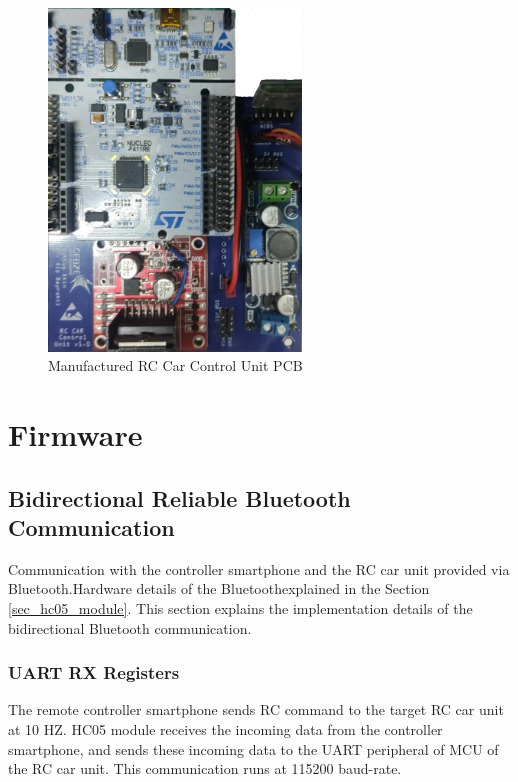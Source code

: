\begin{figure}[!htbp]
    \centering
    \includegraphics[width=0.6\textwidth]{Imgs/pcb_manufactured.jpeg}
    \caption{\label{fig:custom_pcb_manufactured}Manufactured RC Car Control Unit PCB}
\end{figure}


\section{Firmware} \label{sec_firmware_design}

\subsection{Bidirectional Reliable Bluetooth Communication} \label{sec_bluetooth_comm}

Communication with the controller smartphone and the RC car unit provided via Bluetooth\texttrademark.\;Hardware details of the Bluetooth\texttrademark\;explained in the Section \ref{sec_hc05_module}. This section explains the implementation details of the bidirectional Bluetooth\texttrademark\; communication.

\subsubsection{UART RX Registers} \label{sec_receive_rc_command}

The remote controller smartphone sends RC command to the target RC car unit at 10 HZ. HC05 module receives the incoming data from the controller smartphone, and sends these incoming data to the UART peripheral of MCU of the RC car unit. This communication runs at 115200 baud-rate.

